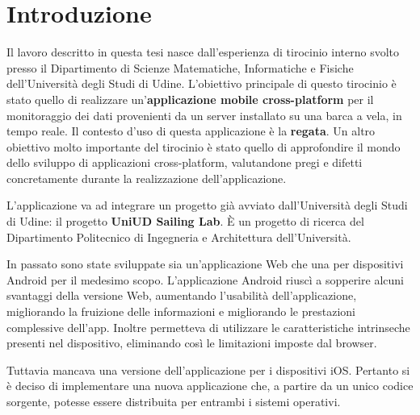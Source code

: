 


\chapter{Introduzione}
Il lavoro descritto in questa tesi nasce dall'esperienza di tirocinio interno svolto presso il Dipartimento di Scienze Matematiche, Informatiche e Fisiche dell’Università degli Studi di Udine. L'obiettivo principale di questo tirocinio è stato quello di realizzare un'\textbf{applicazione mobile cross-platform} per il monitoraggio dei dati provenienti da un server installato su una barca a vela, in tempo reale. Il contesto d'uso di questa applicazione è la \textbf{regata}. Un altro obiettivo molto importante del tirocinio è stato quello di approfondire il mondo dello sviluppo di applicazioni cross-platform, valutandone pregi e difetti concretamente durante la  realizzazione dell'applicazione.

L'applicazione va ad integrare un progetto già avviato dall'Università degli Studi di Udine: il progetto \textbf{UniUD Sailing Lab}. È un progetto di ricerca del Dipartimento Politecnico di Ingegneria e Architettura dell’Università.

In passato sono state sviluppate sia un'applicazione Web che una per dispositivi Android per il medesimo scopo. L'applicazione Android riuscì a sopperire alcuni svantaggi della versione Web, aumentando l'usabilità dell'applicazione, migliorando la fruizione delle informazioni e migliorando le prestazioni complessive dell'app. Inoltre permetteva di utilizzare le caratteristiche intrinseche presenti nel dispositivo, eliminando così le limitazioni imposte dal browser.

Tuttavia mancava una versione dell'applicazione per i dispositivi iOS. Pertanto si è deciso di implementare una nuova applicazione che, a partire da un unico codice sorgente, potesse essere distribuita per entrambi i sistemi operativi.

